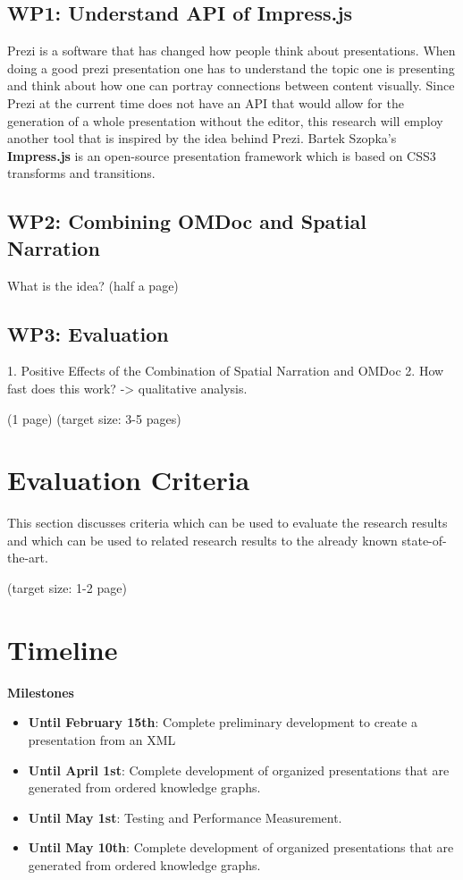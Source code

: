 \documentclass[twoside]{article}
\begin{document}
\subsection{WP1: Understand API of Impress.js}

Prezi is a software that has changed how people think about presentations. When doing a good prezi presentation one has to understand the topic one is presenting and think about how one can portray connections between content visually. Since Prezi at the current time does not have an API that would allow for the generation of a whole presentation without the editor, this research will employ another tool that is inspired by the idea behind Prezi. Bartek Szopka's \textbf{Impress.js} is an open-source presentation framework which is based on CSS3 transforms and transitions.\cite{Impress}



\subsection{WP2: Combining OMDoc and Spatial Narration}

What is the idea?
(half a page)
\newpage
\subsection{WP3: Evaluation}
1. Positive Effects of the Combination of Spatial Narration and OMDoc
2. How fast does this work?
-> qualitative analysis. 

(1 page)
\newpage
  (target size: 3-5 pages)
\newpage


\section{Evaluation Criteria}



  This section discusses criteria which can be used to evaluate the
  research results and which can be used to related research results
  to the already known state-of-the-art.

  (target size: 1-2 page)
\newpage
  \section{Timeline}

\textbf{Milestones}
\begin{itemize}
\item \textbf{Until February 15th}: Complete preliminary development to create a presentation from an XML
\item \textbf{Until April 1st}: Complete development of organized presentations that are generated from ordered knowledge graphs.
\item \textbf{Until May 1st}: Testing and Performance Measurement.
\item \textbf{Until May 10th}: Complete development of organized presentations that are generated from ordered knowledge graphs.
\end{itemize}
\end{document}
